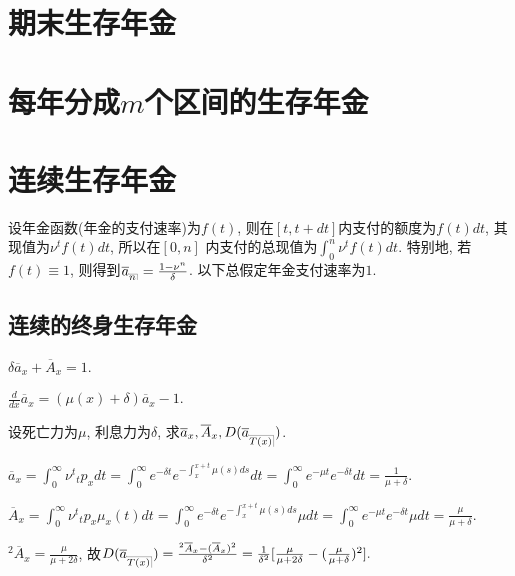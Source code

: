 \documentclass[lang=cn,10pt]{elegantbook}
\makeatletter
\DeclareRobustCommand{\annu}[1]{_{%
    \def\arraystretch{0}%
    \setlength\arraycolsep{1pt}%
    \setlength\arrayrulewidth{.2pt}%
    \begin{array}[b]{@{}c|}\hline
        \\[\arraycolsep]%
        \scriptstyle #1%
    \end{array}%
}}
\makeatother
\begin{document}
\section{期末生存年金}
\section{每年分成$m$个区间的生存年金}

\section{连续生存年金}
\begin{definition}[连续年金]
    设年金函数(年金的支付速率)为$f(t)$, 则在$[t,t+dt]$内支付的额度为$f(t)dt$, 其现值为$\nu^tf(t)dt$, 所以在$[0,n]$ 内支付的总现值为$\int_0^n \nu^tf(t)dt$. 特别地, 若$f(t) \equiv 1$, 则得到$\overline{a}_{\annu n} = \frac{1-\nu^n}{\delta}$.
    以下总假定年金支付速率为$1.$
\end{definition}

\subsection{连续的终身生存年金}
\begin{corollary}
    $\delta \overline{a}_x + \overline{A}_x = 1$.
\end{corollary}

\begin{proposition}
    $\frac{d}{dx}\overline{a}_x = (\mu(x)+\delta)\overline{a}_x-1.$
\end{proposition}

\begin{example}
    设死亡力为$\mu$, 利息力为$\delta$, 求$\overline{a}_x, \overline{A}_x, D(\overline{a}_{\annu{T(x)}})$.
\end{example}
\begin{solution}
    $\overline{a}_x = \int_0^{\infty} \nu^t {}_tp_xdt = \int_0^{\infty} e^{-\delta t}e^{-\int_{x}^{x+t}\mu(s)ds}dt = \int_0^{\infty} e^{-\mu t}e^{-\delta t}dt = \frac{1}{\mu+\delta}.$

    $\overline{A}_x = \int_0^{\infty} \nu^t {}_tp_x\mu_x(t)dt = \int_0^{\infty} e^{-\delta t}e^{-\int_{x}^{x+t}\mu(s)ds}\mu dt = \int_0^{\infty} e^{-\mu t}e^{-\delta t}\mu dt = \frac{\mu}{\mu+\delta}.$

    ${}^2\overline{A}_x = \frac{\mu}{\mu+2\delta}$, 故$D(\overline{a}_{\annu{T(x)}}) = \frac{{}^2\overline{A}_x - (\overline{A}_x)^2}{\delta^2} = \frac{1}{\delta^2}[\frac{\mu}{\mu+2\delta} - (\frac{\mu}{\mu+\delta})^2].$
\end{solution}
\end{document}
